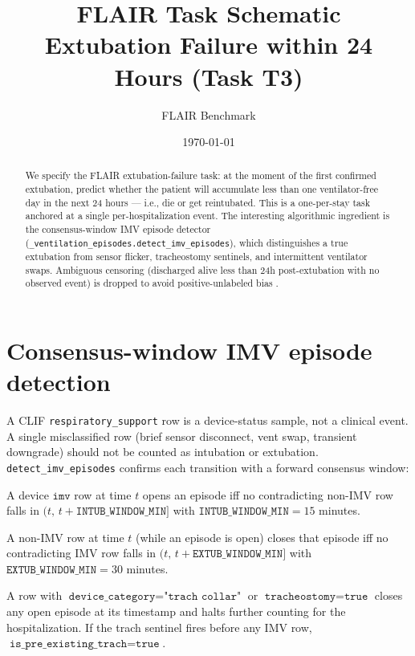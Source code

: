 \documentclass[11pt]{article}
\title{\textbf{FLAIR Task Schematic} \\[0.3em]
       Extubation Failure within 24 Hours (Task T3)}
\author{FLAIR Benchmark}
\date{\today}
\begin{document}
\maketitle

\begin{abstract}
\noindent We specify the FLAIR extubation-failure task: at the moment
of the first confirmed extubation, predict whether the patient will
accumulate less than one ventilator-free day in the next 24 hours ---
i.e., die or get reintubated. This is a one-per-stay task anchored at a
single per-hospitalization event. The interesting algorithmic
ingredient is the consensus-window IMV episode detector
(\texttt{\_ventilation\_episodes.detect\_imv\_episodes}), which
distinguishes a true extubation from sensor flicker, tracheostomy
sentinels, and intermittent ventilator swaps. Ambiguous censoring
(discharged alive less than 24h post-extubation with no observed
event) is dropped to avoid positive-unlabeled bias
\citep{epstein1997vfd, thille2011extubation}.
\end{abstract}

\section{Consensus-window IMV episode detection}
\label{sec:consensus}

A CLIF \texttt{respiratory\_support} row is a device-status sample, not
a clinical event. A single misclassified row (brief sensor disconnect,
vent swap, transient downgrade) should not be counted as intubation or
extubation. \texttt{detect\_imv\_episodes} confirms each transition
with a forward consensus window:

\begin{description}[leftmargin=2em, style=nextline]
  \item[IMV start.]
    A device $\texttt{imv}$ row at time $t$ opens an episode iff no
    contradicting non-IMV row falls in $(t,\, t + \texttt{INTUB\_WINDOW\_MIN}]$
    with $\texttt{INTUB\_WINDOW\_MIN} = 15$ minutes.

  \item[Episode close (true extubation).]
    A non-IMV row at time $t$ (while an episode is open) closes that
    episode iff no contradicting IMV row falls in
    $(t,\, t + \texttt{EXTUB\_WINDOW\_MIN}]$ with
    $\texttt{EXTUB\_WINDOW\_MIN} = 30$ minutes.

  \item[Trach sentinel.]
    A row with
    $\texttt{device\_category} = \texttt{"trach collar"}$ or
    $\texttt{tracheostomy} = \texttt{true}$ closes any open episode at
    its timestamp and halts further counting for the hospitalization.
    If the trach sentinel fires before any IMV row,
    $\texttt{is\_pre\_existing\_trach} = \texttt{true}$.
\end{description}
\end{document}
